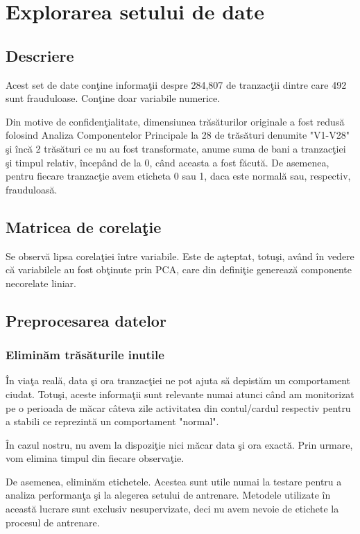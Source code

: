 \chapter{Explorarea setului de date}

\section{Descriere}

Acest set de date conţine informaţii despre 284,807 de tranzacţii dintre care 
492 sunt frauduloase. Conţine doar variabile numerice.

Din motive de confidenţialitate, dimensiunea trăsăturilor originale a fost 
redusă folosind Analiza Componentelor Principale la 28 de trăsături denumite 
"V1-V28" şi încă 2 trăsături ce nu au fost transformate, anume suma de bani
a tranzacţiei şi timpul relativ, începând de la 0, când aceasta a fost făcută. 
De asemenea, pentru fiecare tranzacţie avem eticheta 0 sau 1, daca este normală 
sau, respectiv, frauduloasă.

\section{Matricea de corelaţie}

Se observă lipsa corelaţiei între variabile. Este de aşteptat, totuşi, având în 
vedere că variabilele au fost obţinute prin PCA, care din definiţie generează 
componente necorelate liniar.

\section{Preprocesarea datelor}

\subsection{Eliminăm trăsăturile inutile}

În viaţa reală, data şi ora tranzacţiei ne pot ajuta să depistăm un comportament 
ciudat. Totuşi, aceste informaţii sunt relevante numai atunci când am monitorizat
pe o perioada de măcar câteva zile activitatea din contul/cardul respectiv pentru a 
stabili ce reprezintă un comportament "normal".

În cazul nostru, nu avem la dispoziţie nici măcar data şi ora exactă. Prin urmare, vom
elimina timpul din fiecare observaţie.

De asemenea, eliminăm etichetele. Acestea sunt utile numai la testare pentru a analiza 
performanţa şi la alegerea setului de antrenare. Metodele utilizate în această lucrare
sunt exclusiv nesupervizate, deci nu avem nevoie de etichete la procesul de antrenare.

